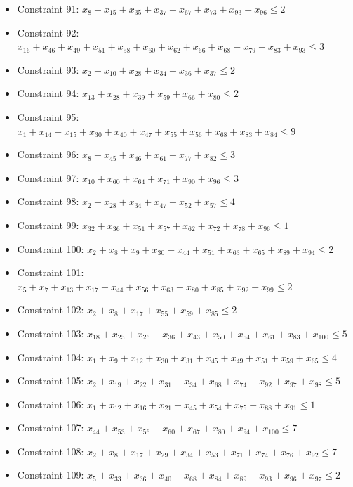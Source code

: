 \documentclass[11pt]{article}
\begin{document}
\begin{itemize}
\item Constraint 91: $x_{8} + x_{15} + x_{35} + x_{37} + x_{67} + x_{73} + x_{93} + x_{96} \le 2$
\item Constraint 92: $x_{16} + x_{46} + x_{49} + x_{51} + x_{58} + x_{60} + x_{62} + x_{66} + x_{68} + x_{79} + x_{83} + x_{93} \le 3$
\item Constraint 93: $x_{2} + x_{10} + x_{28} + x_{34} + x_{36} + x_{37} \le 2$
\item Constraint 94: $x_{13} + x_{28} + x_{39} + x_{59} + x_{66} + x_{80} \le 2$
\item Constraint 95: $x_{1} + x_{14} + x_{15} + x_{30} + x_{40} + x_{47} + x_{55} + x_{56} + x_{68} + x_{83} + x_{84} \le 9$
\item Constraint 96: $x_{8} + x_{45} + x_{46} + x_{61} + x_{77} + x_{82} \le 3$
\item Constraint 97: $x_{10} + x_{60} + x_{64} + x_{71} + x_{90} + x_{96} \le 3$
\item Constraint 98: $x_{2} + x_{28} + x_{34} + x_{47} + x_{52} + x_{57} \le 4$
\item Constraint 99: $x_{32} + x_{36} + x_{51} + x_{57} + x_{62} + x_{72} + x_{78} + x_{96} \le 1$
\item Constraint 100: $x_{2} + x_{8} + x_{9} + x_{30} + x_{44} + x_{51} + x_{63} + x_{65} + x_{89} + x_{94} \le 2$
\item Constraint 101: $x_{5} + x_{7} + x_{13} + x_{17} + x_{44} + x_{56} + x_{63} + x_{80} + x_{85} + x_{92} + x_{99} \le 2$
\item Constraint 102: $x_{2} + x_{8} + x_{17} + x_{55} + x_{59} + x_{85} \le 2$
\item Constraint 103: $x_{18} + x_{25} + x_{26} + x_{36} + x_{43} + x_{50} + x_{54} + x_{61} + x_{83} + x_{100} \le 5$
\item Constraint 104: $x_{1} + x_{9} + x_{12} + x_{30} + x_{31} + x_{45} + x_{49} + x_{51} + x_{59} + x_{65} \le 4$
\item Constraint 105: $x_{2} + x_{19} + x_{22} + x_{31} + x_{34} + x_{68} + x_{74} + x_{92} + x_{97} + x_{98} \le 5$
\item Constraint 106: $x_{1} + x_{12} + x_{16} + x_{21} + x_{45} + x_{54} + x_{75} + x_{88} + x_{91} \le 1$
\item Constraint 107: $x_{44} + x_{53} + x_{56} + x_{60} + x_{67} + x_{80} + x_{94} + x_{100} \le 7$
\item Constraint 108: $x_{2} + x_{8} + x_{17} + x_{29} + x_{34} + x_{53} + x_{71} + x_{74} + x_{76} + x_{92} \le 7$
\item Constraint 109: $x_{5} + x_{33} + x_{36} + x_{40} + x_{68} + x_{84} + x_{89} + x_{93} + x_{96} + x_{97} \le 2$

\end{itemize}
\end{document}
